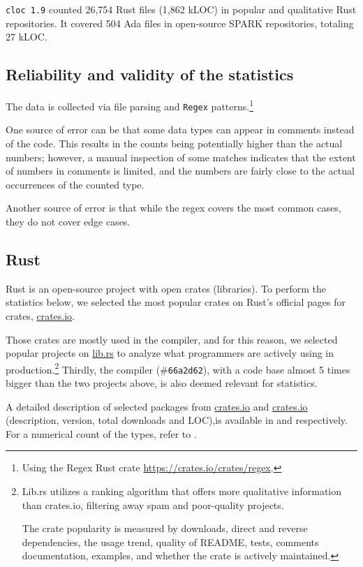\documentclass[nomenclature, english, bibtex]{kththesis}
\begin{document}
\texttt{cloc 1.9} counted 26,754 Rust files (1,862 k\gls{LOC}) in popular and qualitative Rust repositories. It covered 504 Ada files in open-source SPARK repositories, totaling 27 kLOC.

\subsection{Reliability and validity of the statistics}

The data is collected via file parsing and \texttt{Regex} patterns.\footnote{Using the Regex Rust crate \href{(documentation)}{https://crates.io/crates/regex}.} 

One source of error can be that some data types can appear in comments instead of the code. This results in the counts being potentially higher than the actual numbers; however, a manual inspection of some matches indicates that the extent of numbers in comments is limited, and the numbers are fairly close to the actual occurrences of the counted type.

Another source of error is that while the regex covers the most common cases, they do not cover edge cases.

\subsection{Rust}

Rust is an open-source project with open crates (libraries). To perform the statistics below, we selected the most popular crates on Rust's official pages for crates, \href{https://crates.io/}{crates.io}. 

Those crates are mostly used in the compiler, and for this reason, we selected popular projects on \href{https://lib.rs}{lib.rs} to analyze what programmers are actively using in production.\footnote{Lib.rs utilizes a ranking algorithm that offers more qualitative information than crates.io, filtering away spam and poor-quality projects. 

The crate popularity is measured by downloads, direct and reverse dependencies, the usage trend, quality of README, tests, comments documentation, examples, and whether the crate is actively maintained.}
Thirdly, the compiler (\#\texttt{66a2d62}), with a code base almost 5 times bigger than the two projects above, is also deemed relevant for statistics.

A detailed description of selected packages from \href{https://lib.rs/}{crates.io} and \href{https://lib.rs/}{crates.io} (description, version, total downloads and \gls{LOC}),is available in  and  respectively. For a numerical count of the types, refer to .
\end{document}
